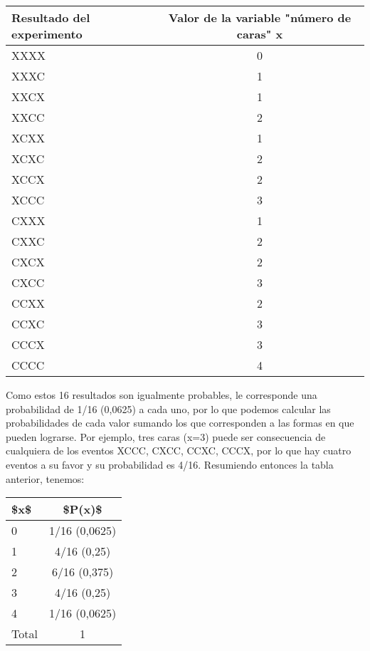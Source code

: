 \documentclass[]{article}
\begin{document}
\begin{table}[H]
\centering
\begin{tabular}{lc}
\toprule
Resultado del experimento & Valor de la variable "número de caras" x\\
\midrule
\rowcolor{gray!6}  XXXX & 0\\
XXXC & 1\\
\rowcolor{gray!6}  XXCX & 1\\
XXCC & 2\\
\rowcolor{gray!6}  XCXX & 1\\
\addlinespace
XCXC & 2\\
\rowcolor{gray!6}  XCCX & 2\\
XCCC & 3\\
\rowcolor{gray!6}  CXXX & 1\\
CXXC & 2\\
\addlinespace
\rowcolor{gray!6}  CXCX & 2\\
CXCC & 3\\
\rowcolor{gray!6}  CCXX & 2\\
CCXC & 3\\
\rowcolor{gray!6}  CCCX & 3\\
\addlinespace
CCCC & 4\\
\bottomrule
\end{tabular}
\end{table}

Como estos 16 resultados son igualmente probables, le corresponde una
probabilidad de 1/16 (0,0625) a cada uno, por lo que podemos calcular
las probabilidades de cada valor sumando los que corresponden a las
formas en que pueden lograrse. Por ejemplo, tres caras (x=3) puede ser
consecuencia de cualquiera de los eventos XCCC, CXCC, CCXC, CCCX, por lo
que hay cuatro eventos a su favor y su probabilidad es 4/16. Resumiendo
entonces la tabla anterior, tenemos:

\begin{table}[H]
\centering
\begin{tabular}{lc}
\toprule
\$x\$ & \$P(x)\$\\
\midrule
\rowcolor{gray!6}  0 & 1/16 (0,0625)\\
1 & 4/16 (0,25)\\
\rowcolor{gray!6}  2 & 6/16 (0,375)\\
3 & 4/16 (0,25)\\
\rowcolor{gray!6}  4 & 1/16 (0,0625)\\
\addlinespace
Total & 1\\
\bottomrule
\end{tabular}
\end{table}
\end{document}
